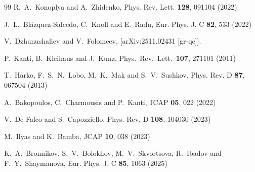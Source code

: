 \documentclass[11pt,a4paper]{article}
\begin{document}
\begin{thebibliography}{99}
R.~A.~Konoplya and A.~Zhidenko,
Phys. Rev. Lett. \textbf{128}, 091104 (2022)

J.~L.~Bl{\'a}zquez-Salcedo, C.~Knoll and E.~Radu,
Eur. Phys. J. C \textbf{82}, 533 (2022)

V.~Dzhunushaliev and V.~Folomeev,
[arXiv:2511.02431 [gr-qc]].



  P.~Kanti, B.~Kleihaus and J.~Kunz,
  Phys.\ Rev.\ Lett.\  {\bf 107}, 271101 (2011)


T.~Harko, F.~S.~N.~Lobo, M.~K.~Mak and S.~V.~Sushkov,
Phys. Rev. D \textbf{87}, 067504 (2013)

A.~Bakopoulos, C.~Charmousis and P.~Kanti,
JCAP \textbf{05}, 022 (2022)

V.~De Falco and S.~Capozziello,
Phys. Rev. D \textbf{108}, 104030 (2023)

M.~Ilyas and K.~Bamba,
JCAP \textbf{10}, 038 (2023)

K.~A.~Bronnikov, S.~V.~Bolokhov, M.~V.~Skvortsova, R.~Ibadov and F.~Y.~Shaymanova,
Eur. Phys. J. C \textbf{85}, 1063 (2025)


\end{thebibliography}
\end{document}

